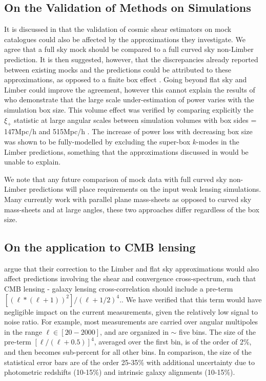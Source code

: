 \subsection{On the Validation of Methods on Simulations}
It is discussed in \citet{kitching/etal:2016} that the validation of cosmic shear estimators on mock catalogues could also be affected by the approximations they investigate.  We agree that a full sky mock should be compared to a full curved sky non-Limber prediction.  It is then suggested, however, that the discrepancies already reported between existing mocks and the predictions could be attributed to these approximations, as opposed to a finite box effect \citep{kiessling/etal:2011, harnois-deraps/etal:2012, harnois-deraps/vanwaerbeke:2015}.  Going beyond flat sky and Limber could improve the agreement, however this cannot explain the results of \citet{harnois-deraps/vanwaerbeke:2015} who demonstrate that the large scale under-estimation of power varies with the simulation box size. This volume effect was verified by comparing explicitly the $\xi_+$ statistic at large angular scales between simulation volumes with box sides = 147Mpc/h and 515Mpc/h \citep[see Fig. 5 in][]{harnois-deraps/vanwaerbeke:2015}. The increase of power loss with decreasing box size was shown to be fully-modelled by excluding the super-box $k$-modes in the Limber predictions, something that the approximations discussed in \citet{kitching/etal:2016} would be unable to explain.

We note that any future comparison of mock data with full curved sky non-Limber predictions will place requirements on the input weak lensing simulations.  Many currently work with parallel plane mass-sheets as opposed to curved sky mass-sheets and at large angles, these two approaches differ regardless of the box size. 

\subsection{On the application to CMB lensing}
\citet{kitching/etal:2016} argue that their correction to the Limber and flat sky approximations would also affect predictions involving the shear and convergence cross-spectrum, such that CMB lensing - galaxy lensing cross-correlation should include a pre-term $ [(\ell*(\ell+1))^2]/(\ell+1/2)^4.$.   We have verified that this term would have negligible impact on the current measurements, given the relatively low signal to noise ratio. For example, most measurements \citep{hand/etal:2015, liu/hill:2015, kirk/etal:2016,harnois-deraps/etal:2016} are carried over angular multipoles in the range $\ell \in [20-2000]$, and are organized in $\sim$ five bins. The size of the pre-term $[\ell/(\ell+0.5)]^4$, averaged over the first bin, is of the order of 2\%, and then becomes sub-percent for all other bins. In comparison, the size of the statistical error bars are of the order 25-35\% with additional uncertainty due to photometric redshifts (10-15\%) and intrinsic galaxy alignments (10-15\%).





